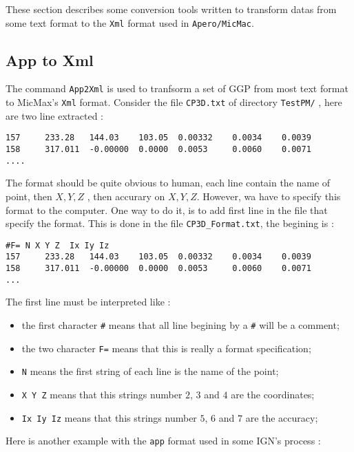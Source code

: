 These section describes some conversion tools  written to transform
datas from some text format to the {\tt Xml} format used in {\tt Apero/MicMac}.


\subsection{App to Xml}

The command {\tt App2Xml} is used to tranfsorm a set of GGP from most text
format to MicMax's {\tt Xml} format. Consider the file {\tt CP3D.txt}
of directory {\tt TestPM/} , here are two line extracted :


\begin{verbatim}
157     233.28   144.03    103.05  0.00332    0.0034    0.0039 
158     317.011  -0.00000  0.0000  0.0053     0.0060    0.0071
....
\end{verbatim}

The format should be quite obvious to human, each line contain the name of point,
then $X,Y,Z$ , then accurary on $X,Y,Z$. However, wa have to specify this format to the computer.
One way to do it, is to add first line in the file that specify the format.
This is done in the file {\tt CP3D\_Format.txt}, the begining is :


\begin{verbatim}
#F= N X Y Z  Ix Iy Iz
157     233.28   144.03    103.05  0.00332    0.0034    0.0039 
158     317.011  -0.00000  0.0000  0.0053     0.0060    0.0071
...
\end{verbatim}

The first line must be interpreted like :


\begin{itemize}
   \item  the first character {\tt \#}  means that  all line begining by a {\tt \#} will be
          a comment;
   \item  the two character {\tt F=}  means that this is really a format specification;
   \item  {\tt N}  means the first string of each line is the name of the point;
   \item  {\tt X Y Z}  means that this strings number $2$, $3$ and $4$ are the coordinates;
   \item  {\tt Ix Iy Iz}  means that this strings number $5$, $6$ and $7$ are the accuracy;
\end{itemize}


Here is another example with the {\tt app} format used in some IGN's process :

